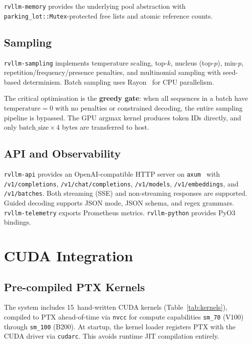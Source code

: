 \documentclass[11pt,a4paper]{article}
\begin{document}
\texttt{rvllm-memory} provides the underlying pool abstraction with
\texttt{parking\_lot::Mutex}-protected free lists and atomic reference counts.

\subsection{Sampling}

\texttt{rvllm-sampling} implements temperature scaling, top-$k$, nucleus (top-$p$),
min-$p$, repetition/frequency/presence penalties, and multinomial sampling with
seed-based determinism. Batch sampling uses Rayon~\cite{rayon2023} for CPU parallelism.

The critical optimisation is the \textbf{greedy gate}: when all sequences in a batch
have $\text{temperature} = 0$ with no penalties or constrained decoding, the entire
sampling pipeline is bypassed. The GPU argmax kernel produces token IDs directly,
and only $\text{batch\_size} \times 4$ bytes are transferred to host.

\subsection{API and Observability}

\texttt{rvllm-api} provides an OpenAI-compatible HTTP server on
\texttt{axum}~\cite{axum2023} with \texttt{/v1/completions},
\texttt{/v1/chat/completions}, \texttt{/v1/models}, \texttt{/v1/embeddings}, and
\texttt{/v1/batches}. Both streaming (SSE) and non-streaming responses are supported.
Guided decoding supports JSON mode, JSON schema, and regex grammars.
\texttt{rvllm-telemetry} exports Prometheus metrics. \texttt{rvllm-python} provides
PyO3 bindings.

\section{CUDA Integration}
\label{sec:cuda}

\subsection{Pre-compiled PTX Kernels}

The system includes 15~hand-written CUDA kernels (Table~\ref{tab:kernels}),
compiled to PTX ahead-of-time via \texttt{nvcc} for compute capabilities
\texttt{sm\_70} (V100) through \texttt{sm\_100} (B200). At startup, the kernel
loader registers PTX with the CUDA driver via \texttt{cudarc}. This avoids runtime
JIT compilation entirely.
\end{document}
